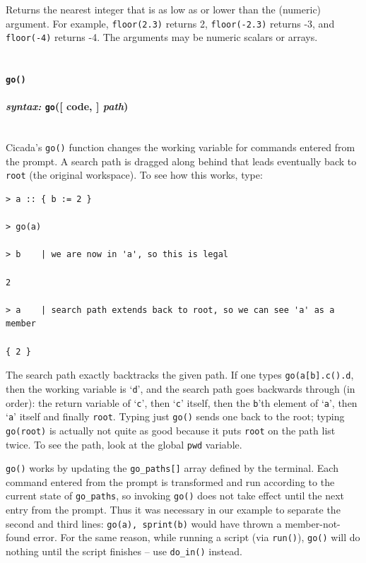 \documentclass{article}
\newenvironment{code}{
       \begin{list}{}{
               \setlength{\leftmargin}{.4in}
               \setlength{\rightmargin}{0in}
               \setlength{\topsep}{.2in}
       }
       \small
       \item[] }
       { \end{list}   }
\begin{document}
Returns the nearest integer that is as low as or lower than the (numeric) argument.  For example, \verb$floor(2.3)$ returns 2, \verb$floor(-2.3)$ returns -3, and \verb$floor(-4)$ returns -4.  The arguments may be numeric scalars or arrays.\\\\






\paragraph{\texttt{go()}\\\\
\normalfont \emph{syntax: } \texttt{go}([ code, ] \emph{path})\\\\}

Cicada's \verb#go()# function changes the working variable for commands entered from the prompt.  A search path is dragged along behind that leads eventually back to \verb#root# (the original workspace).  To see how this works, type:

\begin{code} \begin{verbatim}
> a :: { b := 2 }

> go(a)

> b    | we are now in 'a', so this is legal

2

> a    | search path extends back to root, so we can see 'a' as a member

{ 2 }
\end{verbatim} \end{code}

The search path exactly backtracks the given path.  If one types \verb#go(a[b].c().d#, then the working variable is `\verb#d#', and the search path goes backwards through (in order):  the return variable of `\verb#c#', then `\verb#c#' itself, then the \verb#b#'th element of `\verb#a#', then `\verb#a#' itself and finally \verb#root#.  Typing just \verb#go()# sends one back to the root; typing \verb#go(root)# is actually not quite as good because it puts \verb#root# on the path list twice.  To see the path, look at the global \verb#pwd# variable.

\verb#go()# works by updating the \verb#go_paths[]# array defined by the terminal.  Each command entered from the prompt is transformed and run according to the current state of \verb#go_paths#, so invoking \verb#go()# does not take effect until the next entry from the prompt.  Thus it was necessary in our example to separate the second and third lines:  \verb#go(a), sprint(b)# would have thrown a member-not-found error.  For the same reason, while running a script (via \verb#run()#), \verb#go()# will do nothing until the script finishes -- use \verb#do_in()# instead.
\end{document}
